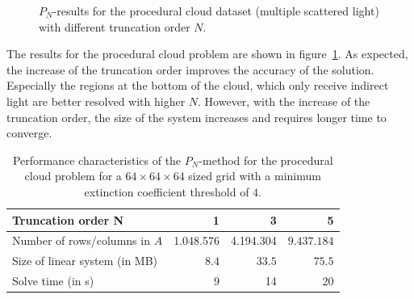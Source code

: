 \begin{figure}[h]
\caption{$P_N$-results for the procedural cloud dataset (multiple scattered light) with different truncation order $N$.}
\label{fig:pn_results_nebulae1}
\end{figure}

The results for the procedural cloud problem are shown in figure~\ref{fig:pn_results_nebulae1}. As expected, the increase of the truncation order improves the accuracy of the solution. Especially the regions at the bottom of the cloud, which only receive indirect light are better resolved with higher $N$. However, with the increase of the truncation order, the size of the system increases and requires longer time to converge.

\begin{table}[!h]
	\centering
	\caption{Performance characteristics of the $P_N$-method for the procedural cloud problem for a $64\times64\times64$ sized grid with a minimum extinction coefficient threshold of $4$.}
	\label{tab:results_cloud}
	\begin{tabular}{l r r r}
    \hline
	Truncation order \textbf{N}
    & 1 & 3 & 5
    \\
    \hline
    Number of rows/columns in $A$
    & 1.048.576 & 4.194.304 & $9.437.184$
    \\
    Size of linear system (in MB)
    & $8.4$ & $33.5$ & $75.5$
    \\
    Solve time (in s)
    & 9 & 14 & 20
	\end{tabular}
\end{table}

